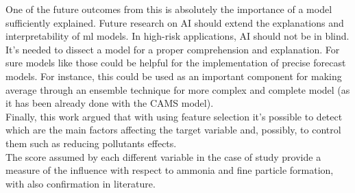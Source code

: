 One of the future outcomes from this is absolutely the importance of a model sufficiently explained.
Future research on AI should extend the explanations and interpretability of \acrshort{ml} models.
In high-risk applications, AI should not be in blind. 
It's needed to dissect a model for a proper comprehension and explanation.
For sure models like those could be helpful for the implementation of precise forecast models.  
For instance, this could be used as an important component for making average through an ensemble technique for more complex and complete model (as it has been already done with the CAMS model).
\\
Finally, this work argued that with using feature selection it's possible to detect which are the main factors affecting the target variable and, possibly, to control them such as reducing pollutants effects.\\
The score assumed by each different variable in the case of study provide a measure of the influence with respect to ammonia and fine particle formation, with also confirmation in literature.
\begin{comment}
Looking forward, further attempts for reducing pollutant formation should be made by procedures actually used.
\end{comment}
